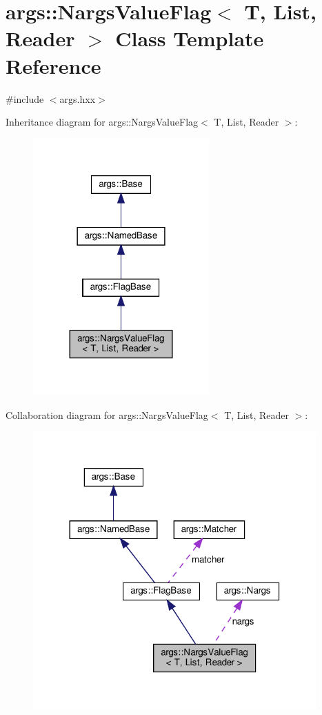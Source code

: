 \hypertarget{classargs_1_1_nargs_value_flag}{}\section{args\+:\+:Nargs\+Value\+Flag$<$ T, List, Reader $>$ Class Template Reference}
\label{classargs_1_1_nargs_value_flag}


{\ttfamily \#include $<$args.\+hxx$>$}



Inheritance diagram for args\+:\+:Nargs\+Value\+Flag$<$ T, List, Reader $>$\+:\nopagebreak
\begin{figure}[H]
\begin{center}
\leavevmode
\includegraphics[width=191pt]{classargs_1_1_nargs_value_flag__inherit__graph}
\end{center}
\end{figure}


Collaboration diagram for args\+:\+:Nargs\+Value\+Flag$<$ T, List, Reader $>$\+:\nopagebreak
\begin{figure}[H]
\begin{center}
\leavevmode
\includegraphics[width=308pt]{classargs_1_1_nargs_value_flag__coll__graph}
\end{center}
\end{figure}
